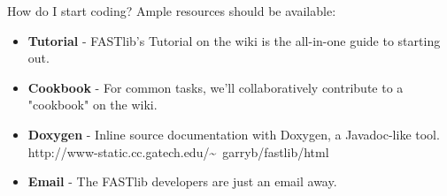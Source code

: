 \documentclass[pdf,colorBG,slideColor]{prosper}
\newcommand{\itemt}[1]{\item {\bf #1} -}
\begin{document}
%

\begin{slide}{How do I start coding?}
 \vspace*{.3in}
 Ample resources should be available: \\
 \begin{itemize}
 \itemt{Tutorial} FASTlib's Tutorial on the wiki is the all-in-one guide to starting out.
 \itemt{Cookbook}
 For common tasks, we'll collaboratively contribute to a "cookbook" on the wiki.
 \itemt{Doxygen}
 Inline source documentation with Doxygen, a Javadoc-like tool.
 http://www-static.cc.gatech.edu/\~~garryb/fastlib/html
 \itemt{Email}
 The FASTlib developers are just an email away.
 \end{itemize}
\end{slide}
\end{document}
